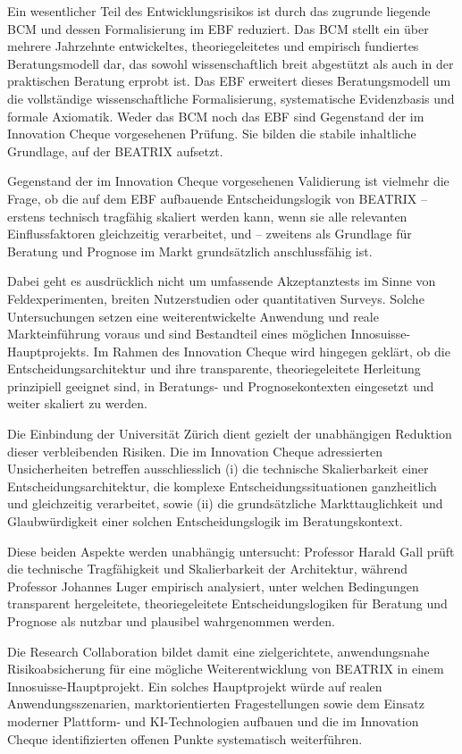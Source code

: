 \documentclass[11pt,a4paper]{article}
\begin{document}
Ein wesentlicher Teil des Entwicklungsrisikos ist durch das zugrunde liegende BCM und dessen Formalisierung im EBF reduziert. Das BCM stellt ein über mehrere Jahrzehnte entwickeltes, theoriegeleitetes und empirisch fundiertes Beratungsmodell dar, das sowohl wissenschaftlich breit abgestützt als auch in der praktischen Beratung erprobt ist. Das EBF erweitert dieses Beratungsmodell um die vollständige wissenschaftliche Formalisierung, systematische Evidenzbasis und formale Axiomatik. Weder das BCM noch das EBF sind Gegenstand der im Innovation Cheque vorgesehenen Prüfung. Sie bilden die stabile inhaltliche Grundlage, auf der BEATRIX aufsetzt.

Gegenstand der im Innovation Cheque vorgesehenen Validierung ist vielmehr die Frage, ob die auf dem EBF aufbauende Entscheidungslogik von BEATRIX -- erstens technisch tragfähig skaliert werden kann, wenn sie alle relevanten Einflussfaktoren gleichzeitig verarbeitet, und -- zweitens als Grundlage für Beratung und Prognose im Markt grundsätzlich anschlussfähig ist.

Dabei geht es ausdrücklich nicht um umfassende Akzeptanztests im Sinne von Feldexperimenten, breiten Nutzerstudien oder quantitativen Surveys. Solche Untersuchungen setzen eine weiterentwickelte Anwendung und reale Markteinführung voraus und sind Bestandteil eines möglichen Innosuisse-Hauptprojekts. Im Rahmen des Innovation Cheque wird hingegen geklärt, ob die Entscheidungsarchitektur und ihre transparente, theoriegeleitete Herleitung prinzipiell geeignet sind, in Beratungs- und Prognosekontexten eingesetzt und weiter skaliert zu werden.

Die Einbindung der Universität Zürich dient gezielt der unabhängigen Reduktion dieser verbleibenden Risiken. Die im Innovation Cheque adressierten Unsicherheiten betreffen ausschliesslich (i) die technische Skalierbarkeit einer Entscheidungsarchitektur, die komplexe Entscheidungssituationen ganzheitlich und gleichzeitig verarbeitet, sowie (ii) die grundsätzliche Markttauglichkeit und Glaubwürdigkeit einer solchen Entscheidungslogik im Beratungskontext.

Diese beiden Aspekte werden unabhängig untersucht: Professor Harald Gall prüft die technische Tragfähigkeit und Skalierbarkeit der Architektur, während Professor Johannes Luger empirisch analysiert, unter welchen Bedingungen transparent hergeleitete, theoriegeleitete Entscheidungslogiken für Beratung und Prognose als nutzbar und plausibel wahrgenommen werden.

Die Research Collaboration bildet damit eine zielgerichtete, anwendungsnahe Risikoabsicherung für eine mögliche Weiterentwicklung von BEATRIX in einem Innosuisse-Hauptprojekt. Ein solches Hauptprojekt würde auf realen Anwendungsszenarien, marktorientierten Fragestellungen sowie dem Einsatz moderner Plattform- und KI-Technologien aufbauen und die im Innovation Cheque identifizierten offenen Punkte systematisch weiterführen.
\end{document}
